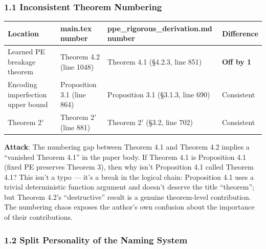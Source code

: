 \documentclass[
  12pt,
]{article}
\begin{document}
\subsubsection{1.1 Inconsistent Theorem Numbering}\label{inconsistent-theorem-numbering}

\begin{longtable}[]{@{}
  >{\raggedright\arraybackslash}p{}
  >{\raggedright\arraybackslash}p{}
  >{\raggedright\arraybackslash}p{}
  >{\raggedright\arraybackslash}p{}@{}}
\toprule\noalign{}
\begin{minipage}[b]{\linewidth}\raggedright
Location
\end{minipage} & \begin{minipage}[b]{\linewidth}\raggedright
main.tex number
\end{minipage} & \begin{minipage}[b]{\linewidth}\raggedright
ppe\_rigorous\_derivation.md number
\end{minipage} & \begin{minipage}[b]{\linewidth}\raggedright
Difference
\end{minipage} \\
\midrule\noalign{}
\endhead
\bottomrule\noalign{}
\endlastfoot
Learned PE breakage theorem & Theorem 4.2 (line 1048) & Theorem 4.1 (\S4.2.3, line 851) & \textbf{Off by 1} \\
Encoding imperfection upper bound & Proposition 3.1 (line 864) & Proposition 3.1 (\S3.1.3, line 690) & Consistent \\
Theorem 2$'$ & Theorem 2$'$ (line 881) & Theorem 2$'$ (\S3.2, line 702) & Consistent \\
\end{longtable}

\textbf{Attack}: The numbering gap between Theorem 4.1 and Theorem 4.2 implies a ``vanished Theorem 4.1'' in the paper body. If Theorem 4.1 is Proposition 4.1 (fixed PE preserves Theorem 3), then why isn't Proposition 4.1 called Theorem 4.1? This isn't a typo --- it's a break in the logical chain: Proposition 4.1 uses a trivial deterministic function argument and doesn't deserve the title ``theorem''; but Theorem 4.2's ``destructive'' result is a genuine theorem-level contribution. The numbering chaos exposes the author's own confusion about the importance of their contributions.

\subsubsection{1.2 Split Personality of the Naming System}\label{split-personality-naming}
\end{document}
